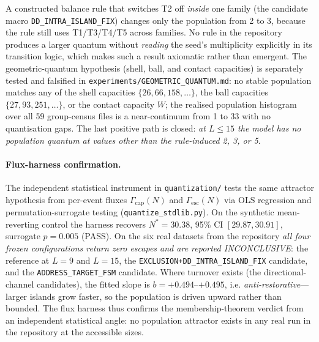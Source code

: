 \documentclass{ijuc}
\begin{document}
A constructed balance rule that switches T2 off \emph{inside} one family (the candidate macro \texttt{DD\_INTRA\_ISLAND\_FIX}) changes only the population from 2 to 3, because the rule still uses T1/T3/T4/T5 across families. No rule in the repository produces a larger quantum without \emph{reading} the seed's multiplicity explicitly in its transition logic, which makes such a result axiomatic rather than emergent. The geometric-quantum hypothesis (shell, ball, and contact capacities) is separately tested and falsified in \texttt{experiments/GEOMETRIC\_QUANTUM.md}: no stable population matches any of the shell capacities $\{26, 66, 158, \dots\}$, the ball capacities $\{27, 93, 251, \dots\}$, or the contact capacity $W$; the realised population histogram over all 59 group-census files is a near-continuum from 1 to 33 with no quantisation gaps. The last positive path is closed: \emph{at $L \le 15$ the model has no population quantum at values other than the rule-induced 2, 3, or 5}.
\paragraph{Flux-harness confirmation.} The independent statistical instrument in \texttt{quantization/} tests the same attractor hypothesis from per-event fluxes $\Gamma_{\mathrm{cap}}(N)$ and $\Gamma_{\mathrm{esc}}(N)$ via OLS regression and permutation-surrogate testing (\texttt{quantize\_stdlib.py}). On the synthetic mean-reverting control the harness recovers $N^* = 30.38$, 95\% CI $[29.87, 30.91]$, surrogate $p = 0.005$ (PASS). On the six real datasets from the repository \emph{all four frozen configurations return zero escapes and are reported INCONCLUSIVE}: the reference at $L = 9$ and $L = 15$, the \texttt{EXCLUSION+DD\_INTRA\_ISLAND\_FIX} candidate, and the \texttt{ADDRESS\_TARGET\_FSM} candidate. Where turnover exists (the directional-channel candidates), the fitted slope is $b = +0.494$--$+0.495$, i.e. \emph{anti-restorative}---larger islands grow faster, so the population is driven upward rather than bounded. The flux harness thus confirms the membership-theorem verdict from an independent statistical angle: no population attractor exists in any real run in the repository at the accessible sizes.
\end{document}
